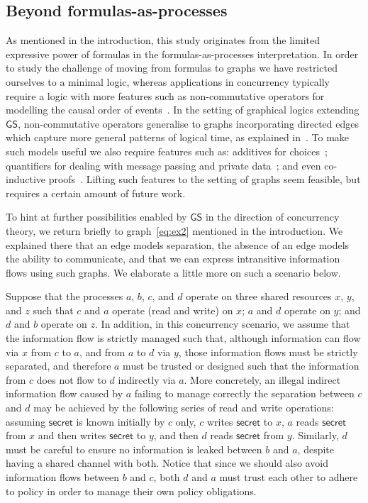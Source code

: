 \documentclass{lmcs} %
\def\GS{\mathsf{GS}}
\theoremstyle{plain}
\begin{document}
\subsection{Beyond formulas-as-processes}

As mentioned in the introduction, this study originates from the limited expressive power of formulas in the formulas-as-processes interpretation.
In order to study the challenge of moving from formulas to graphs we have restricted ourselves to a minimal logic, whereas applications in concurrency typically require a logic with more features such as 
non-commutative operators for modelling the causal order of events~\cite{bruscoli:02,gug:SIS,retore:99}.
In the setting of graphical logics extending $\GS$, non-commutative operators
generalise to graphs incorporating directed edges which capture more general patterns of logical time,
as explained in~\cite{FSCD2022}.
To make such models useful we also require features such as:
additives for choices~\cite{miller:tiu:pi,ross:MAV}; 
quantifiers for dealing with message passing and private data~\cite{ross:MAV1,horne:19};
and even co-inductive proofs~\cite{Horne2020}.
Lifting such features to the setting of graphs seem feasible, but requires a certain amount of future work.



To hint at further possibilities enabled by $\GS$ in the direction of concurrency theory,
we return briefly to graph~\eqref{eq:ex2} mentioned in the introduction.
We explained there that an edge models separation, the absence of an edge models the ability to communicate,
and that we can express intransitive information flows using such graphs.
We elaborate a little more on such a scenario below.



Suppose that the processes $a$, $b$, $c$, and $d$ 
operate on three shared resources $x$, $y$, and $z$ such that
$c$ and $a$ operate (read and write) on  $x$;
	$a$ and $d$ operate on  $y$; and
	$d$ and $b$ operate on  $z$.
In addition, in this concurrency scenario, we assume that the information flow is strictly managed
such that, although information can flow via $x$ from $c$ to $a$, and from $a$ to $d$ via $y$,
those information flows must be strictly separated, and therefore $a$ must be trusted or designed such that the information from $c$ does not flow to $d$ indirectly via $a$. More concretely, an illegal indirect information flow
caused by $a$ failing to manage correctly the separation between $c$ and $d$ 
 may be achieved by the following series of read and write operations:
assuming $\mathsf{secret}$  is known initially by $c$ only, $c$ writes $\mathsf{secret}$ to $x$, $a$ reads $\mathsf{secret}$ from $x$ and then writes $\mathsf{secret}$ to $y$, and then $d$ reads $\mathsf{secret}$ from $y$.
Similarly, $d$ must be careful to ensure no information is leaked between $b$ and $a$, despite having a shared channel with both.
Notice that since we should also avoid information flows between $b$ and $c$,
both $d$ and $a$ must trust each other to adhere to policy in order to manage their own policy obligations.
\end{document}

